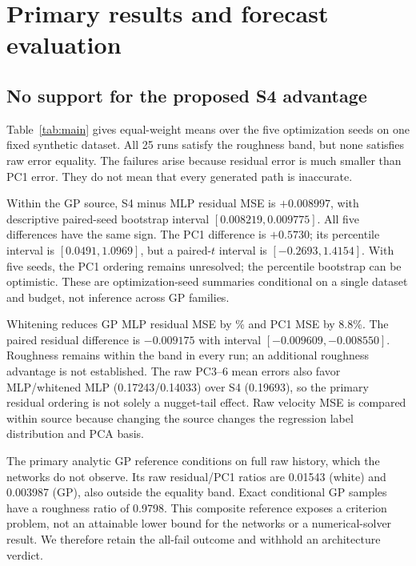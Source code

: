 \documentclass[10pt,twocolumn]{article}
\begin{document}
\section{Primary results and forecast evaluation}
\subsection{No support for the proposed S4 advantage}
Table~\ref{tab:main} gives equal-weight means over the five optimization seeds on one fixed synthetic dataset. All 25 runs satisfy the roughness band, but none satisfies raw error equality. The failures arise because residual error is much smaller than PC1 error. They do not mean that every generated path is inaccurate.
\begin{table}[h]
\centering\small
\caption{Primary experiment: mean raw velocity errors and roughness ratio. Pass is the original conjunction, not a new accuracy flag.}\label{tab:main}
\end{table}

Within the GP source, S4 minus MLP residual MSE is $+0.008997$, with descriptive paired-seed bootstrap interval $[0.008219,0.009775]$. All five differences have the same sign. The PC1 difference is $+0.5730$; its percentile interval is $[0.0491,1.0969]$, but a paired-$t$ interval is $[-0.2693,1.4154]$. With five seeds, the PC1 ordering remains unresolved; the percentile bootstrap can be optimistic. These are optimization-seed summaries conditional on a single dataset and budget, not inference across GP families.

Whitening reduces GP MLP residual MSE by \WhiteningReduction\% and PC1 MSE by 8.8\%. The paired residual difference is $-0.009175$ with interval $[-0.009609,-0.008550]$. Roughness remains within the band in every run; an additional roughness advantage is not established. The raw PC3--6 mean errors also favor MLP/whitened MLP (0.17243/0.14033) over S4 (0.19693), so the primary residual ordering is not solely a nugget-tail effect. Raw velocity MSE is compared within source because changing the source changes the regression label distribution and PCA basis.

The primary analytic GP reference conditions on full raw history, which the networks do not observe. Its raw residual/PC1 ratios are 0.01543 (white) and 0.003987 (GP), also outside the equality band. Exact conditional GP samples have a roughness ratio of 0.9798. This composite reference exposes a criterion problem, not an attainable lower bound for the networks or a numerical-solver result. We therefore retain the all-fail outcome and withhold an architecture verdict.
\end{document}
